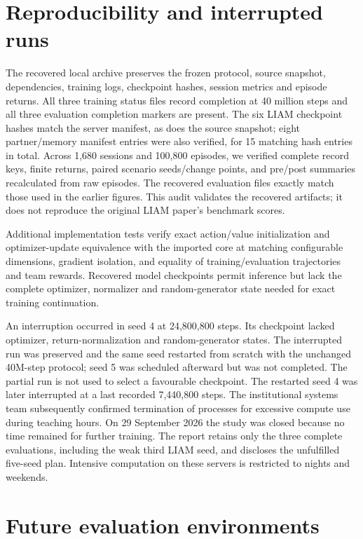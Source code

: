 \documentclass[10pt,a4paper]{article}
\begin{document}
\appendix
\section{Reproducibility and interrupted runs}\label{app:audit}
The recovered local archive preserves the frozen protocol, source snapshot, dependencies, training logs, checkpoint hashes, session metrics and episode returns. All three training status files record completion at 40 million steps and all three evaluation completion markers are present. The six LIAM checkpoint hashes match the server manifest, as does the source snapshot; eight partner/memory manifest entries were also verified, for 15 matching hash entries in total. Across 1,680 sessions and 100,800 episodes, we verified complete record keys, finite returns, paired scenario seeds/change points, and pre/post summaries recalculated from raw episodes. The recovered evaluation files exactly match those used in the earlier figures. This audit validates the recovered artifacts; it does not reproduce the original LIAM paper's benchmark scores.

Additional implementation tests verify exact action/value initialization and optimizer-update equivalence with the imported core at matching configurable dimensions, gradient isolation, and equality of training/evaluation trajectories and team rewards. Recovered model checkpoints permit inference but lack the complete optimizer, normalizer and random-generator state needed for exact training continuation.

An interruption occurred in seed 4 at 24,800,800 steps. Its checkpoint lacked optimizer, return-normalization and random-generator states. The interrupted run was preserved and the same seed restarted from scratch with the unchanged 40M-step protocol; seed 5 was scheduled afterward but was not completed. The partial run is not used to select a favourable checkpoint. The restarted seed 4 was later interrupted at a last recorded 7,440,800 steps. The institutional systems team subsequently confirmed termination of processes for excessive compute use during teaching hours. On 29 September 2026 the study was closed because no time remained for further training. The report retains only the three complete evaluations, including the weak third LIAM seed, and discloses the unfulfilled five-seed plan. Intensive computation on these servers is restricted to nights and weekends.


\section{Future evaluation environments}\label{app:future}
\end{document}
